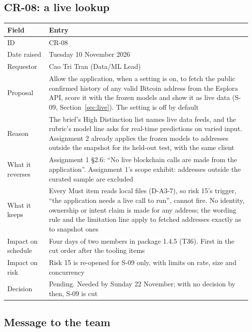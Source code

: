 \subsection{CR-08: a live lookup}

\begin{center}
\small
\begin{tabularx}{\textwidth}{@{}L{3.0cm}Y@{}}
\toprule
\textbf{Field} & \textbf{Entry} \\
\midrule
ID & CR-08 \\
Date raised & Tuesday 10 November 2026 \\
Requestor & Cao Tri Tran (Data/ML Lead) \\
Proposal & Allow the application, when a setting is on, to fetch the public confirmed history of any valid Bitcoin address from the Esplora API, score it with the frozen models and show it as live data (S-09, Section~\ref{sec:live}). The setting is off by default \\
Reason & The brief's High Distinction list names live data feeds, and the rubric's model line asks for real-time predictions on varied input. Assignment 2 already applies the frozen models to addresses outside the snapshot for its held-out test, with the same client \\
What it reverses & Assignment 1 §2.6: ``No live blockchain calls are made from the application''. Assignment 1's scope exhibit: addresses outside the curated sample are excluded \\
What it keeps & Every Must item reads local files (D-A3-7), so risk 15's trigger, ``the application needs a live call to run'', cannot fire. No identity, ownership or intent claim is made for any address; the wording rule and the limitation line apply to fetched addresses exactly as to snapshot ones \\
Impact on schedule & Four days of two members in package 1.4.5 (T36). First in the cut order after the tooling items \\
Impact on risk & Risk 15 is re-opened for S-09 only, with limits on rate, size and concurrency \\
Decision & Pending. Needed by Sunday 22 November; with no decision by then, S-09 is cut \\
\bottomrule
\end{tabularx}
\end{center}

\subsection{Message to the team}

